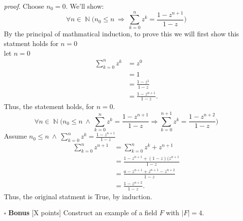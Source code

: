 \documentclass[11pt]{article}
\numberwithin{equation}{section}
\DeclareMathOperator*{\+}{\oplus}
\DeclareMathOperator*{\N}{\mathbb{N}}
\begin{document}
\begin{enumerate}[label= 2.\arabic*), itemsep=0.4cm]
\textit{proof}. Choose $n_0 = 0$. We'll show:
    $$\forall n \in \N \Big( n_0 \leq n \ \Rightarrow \ \sum\limits_{k=0}^n z^k = \frac{1-z^{n+1}}{1-z}\Big)$$
    By the principal of mathmatical induction, to prove this we will first show this statment holds for $n = 0$\\ let $n = 0$
    \begin{align*}
      \sum\limits_{k=0}^n z^k &= z^0\\
                              &= 1\\
                              &= \frac{1-z^1}{1-z}\\
                              &= \frac{1-z^{n+1}}{1-z}.
    \end{align*}
    Thus, the statement holds, for $n=0$.
    $$\forall n \in \N \Big( n_0 \leq n \ \land \ \sum\limits_{k=0}^n z^k = \frac{1-z^{n+1}}{1-z}\Rightarrow \sum\limits_{k=0}^{n+1} z^k = \frac{1-z^{n+2}}{1-z} \Big)$$
Assume $n_0 \leq n \ \land \ \sum\limits_{k=0}^n z^k = \frac{1-z^{n+1}}{1-z}$
\begin{align*}
  \sum\limits_{k=0}^n z^{n+1} &= \sum\limits_{k=0}^n z^k+ z^{n+1} \\
                              &= \frac{1-z^{n+1}+(1-z)(z^{n+1}}{1-z}\\
                              &= \frac{a-z^{n+1}+z^{n+1}-z^{n+2}}{1-z} \\
                              &= \frac{1-z^{n+2}}{1-z}.
\end{align*}
Thus, the original statment is True, by induction. 


\end{enumerate}   

\noindent $\square$ \textbf{Bonus} [X points] Construct an example of a field $F$ with $|F|=4$.

 
\end{document}
